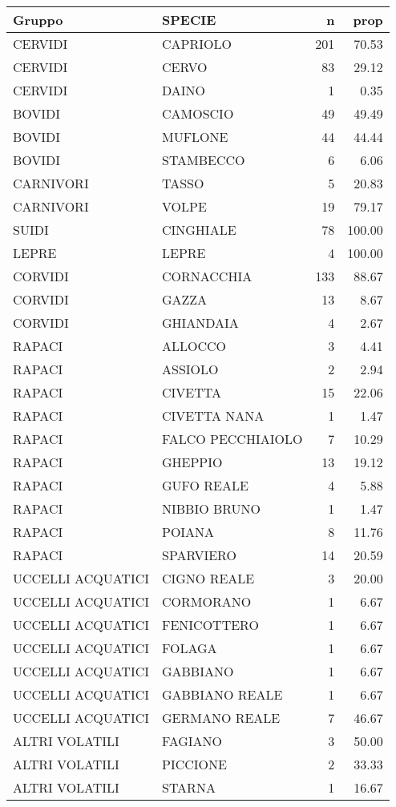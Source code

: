 \documentclass{article}
\begin{document}
\begin{table}[h]
\centering
\caption{}
\begin{tabular}{l|l|r|r}
\hline
Gruppo & SPECIE & n & prop\\
\hline
CERVIDI & CAPRIOLO & 201 & 70.53\\
\hline
CERVIDI & CERVO & 83 & 29.12\\
\hline
CERVIDI & DAINO & 1 & 0.35\\
\hline
BOVIDI & CAMOSCIO & 49 & 49.49\\
\hline
BOVIDI & MUFLONE & 44 & 44.44\\
\hline
BOVIDI & STAMBECCO & 6 & 6.06\\
\hline
CARNIVORI & TASSO & 5 & 20.83\\
\hline
CARNIVORI & VOLPE & 19 & 79.17\\
\hline
SUIDI & CINGHIALE & 78 & 100.00\\
\hline
LEPRE & LEPRE & 4 & 100.00\\
\hline
CORVIDI & CORNACCHIA & 133 & 88.67\\
\hline
CORVIDI & GAZZA & 13 & 8.67\\
\hline
CORVIDI & GHIANDAIA & 4 & 2.67\\
\hline
RAPACI & ALLOCCO & 3 & 4.41\\
\hline
RAPACI & ASSIOLO & 2 & 2.94\\
\hline
RAPACI & CIVETTA & 15 & 22.06\\
\hline
RAPACI & CIVETTA NANA & 1 & 1.47\\
\hline
RAPACI & FALCO PECCHIAIOLO & 7 & 10.29\\
\hline
RAPACI & GHEPPIO & 13 & 19.12\\
\hline
RAPACI & GUFO REALE & 4 & 5.88\\
\hline
RAPACI & NIBBIO BRUNO & 1 & 1.47\\
\hline
RAPACI & POIANA & 8 & 11.76\\
\hline
RAPACI & SPARVIERO & 14 & 20.59\\
\hline
UCCELLI ACQUATICI & CIGNO REALE & 3 & 20.00\\
\hline
UCCELLI ACQUATICI & CORMORANO & 1 & 6.67\\
\hline
UCCELLI ACQUATICI & FENICOTTERO & 1 & 6.67\\
\hline
UCCELLI ACQUATICI & FOLAGA & 1 & 6.67\\
\hline
UCCELLI ACQUATICI & GABBIANO & 1 & 6.67\\
\hline
UCCELLI ACQUATICI & GABBIANO REALE & 1 & 6.67\\
\hline
UCCELLI ACQUATICI & GERMANO REALE & 7 & 46.67\\
\hline
ALTRI VOLATILI & FAGIANO & 3 & 50.00\\
\hline
ALTRI VOLATILI & PICCIONE & 2 & 33.33\\
\hline
ALTRI VOLATILI & STARNA & 1 & 16.67\\
\hline
\end{tabular}
\end{table}
\end{document}
